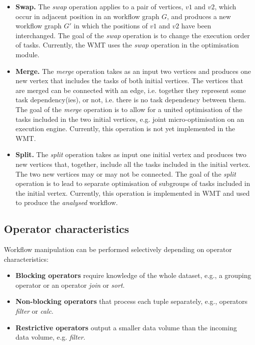 \documentclass[12pt,openany,onecolumn]{book}
\begin{document}
\begin{itemize}
\item \textbf{Swap.} The \emph{swap} operation applies to a pair of vertices, $v1$ and $v2$, which occur in adjacent position in an workflow graph $G$, and produces a new workflow graph $G'$ in which the positions of $v1$ and $v2$ have been interchanged. The goal of the \emph{swap} operation is to change the execution order of tasks. Currently, the WMT uses the \emph{swap} operation in the optimisation module.
\item \textbf{Merge.} The \emph{merge} operation takes as an input two vertices and produces one new vertex that includes the tasks of both initial vertices. The vertices that are merged can be connected with an edge, i.e. together they represent some task dependency(ies), or not, i.e. there is no task dependency between them. The goal of the \emph{merge} operation is to allow for a united optimisation of the tasks included in the two initial vertices, e.g. joint micro-optimisation on an execution engine. Currently, this operation is not yet implemented in the WMT.
\item \textbf{Split.} The \emph{split} operation takes as input one initial vertex and produces two new vertices that, together, include all the tasks included in the initial vertex. The two new vertices may or may not be connected. The goal of the \emph{split} operation is to lead to separate optimisation of subgroups of tasks included in the initial vertex. Currently, this operation is implemented in WMT and used to produce the \emph{analysed} workflow.
\end{itemize}


\subsection{Operator characteristics}\label{subsec:categories}
Workflow manipulation can be performed selectively depending on operator characteristics:

\begin{itemize}
\item \textbf{Blocking operators} require knowledge of the whole dataset, e.g., a grouping operator or an operator \emph{join} or \emph{sort}.
\item \textbf{Non-blocking operators} that process each tuple separately, e.g., operators \emph{filter} or \emph{calc}.
\item \textbf{Restrictive operators} output a smaller data volume than the incoming data volume, e.g. \emph{filter}.
\end{itemize}
\end{document}
